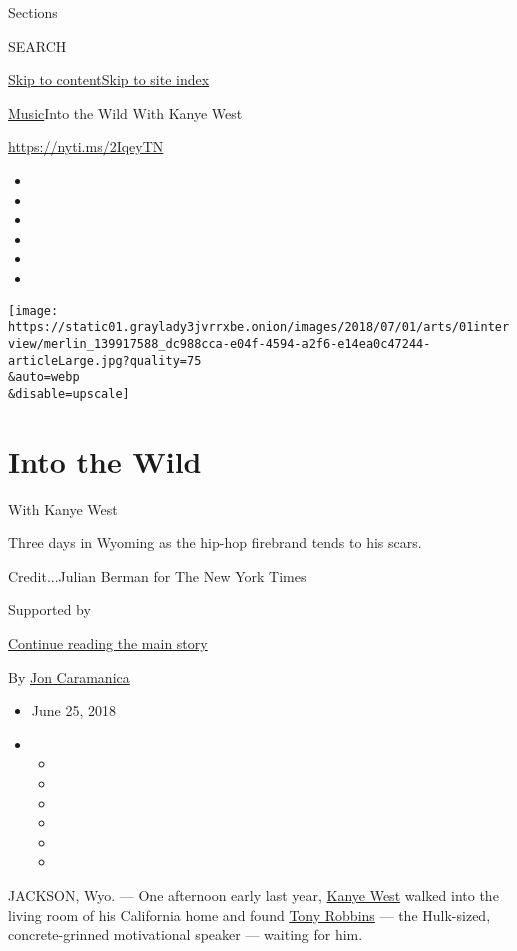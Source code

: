 Sections

SEARCH

\protect\hyperlink{site-content}{Skip to
content}\protect\hyperlink{site-index}{Skip to site index}

\href{/section/arts/music}{Music}\textbar{}Into the Wild With Kanye West

\url{https://nyti.ms/2IqeyTN}

\begin{itemize}
\item
\item
\item
\item
\item
\item
\end{itemize}

\texttt{[image: https://static01.graylady3jvrrxbe.onion/images/2018/07/01/arts/01interview/merlin\_139917588\_dc988cca-e04f-4594-a2f6-e14ea0c47244-articleLarge.jpg?quality=75\\\&auto=webp\\\&disable=upscale]}

\hypertarget{into-the-wild}{%
\section{Into the Wild}\label{into-the-wild}}

With Kanye West

Three days in Wyoming as the hip-hop firebrand tends to his scars.

Credit...Julian Berman for The New York Times

Supported by

\protect\hyperlink{after-sponsor}{Continue reading the main story}

By \href{https://www.nytimes3xbfgragh.onion/by/jon-caramanica}{Jon
Caramanica}

\begin{itemize}
\item
  June 25, 2018
\item
  \begin{itemize}
  \item
  \item
  \item
  \item
  \item
  \item
  \end{itemize}
\end{itemize}

JACKSON, Wyo. --- One afternoon early last year,
\href{https://www.nytimes3xbfgragh.onion/2019/11/25/arts/music/kanye-west-nebuchadnezzar-opera.html}{Kanye
West} walked into the living room of his California home and found
\href{https://www.nytimes3xbfgragh.onion/video/business/100000003456202/tony-robbins-reveals-his-secret.html}{Tony
Robbins} --- the Hulk-sized, concrete-grinned motivational speaker ---
waiting for him.

